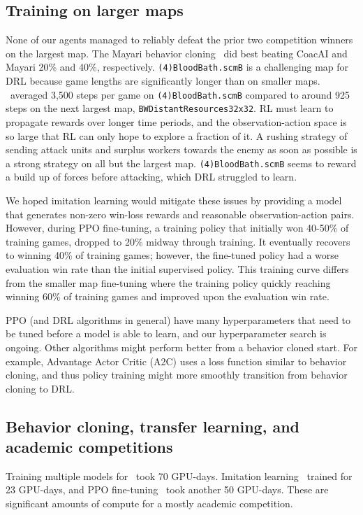 \documentclass{article}
\begin{document}
\subsection{Training on larger maps}
None of our agents managed to reliably defeat the prior two competition winners on 
the largest map. The Mayari behavior cloning \bcAgent\ did best beating
CoacAI and Mayari 20\% and 40\%, respectively. \texttt{(4)BloodBath.scmB} is a
challenging map for DRL because game lengths are significantly longer than on smaller
maps. \bcPPOAgent\ averaged 3,500 steps per game on
\texttt{(4)BloodBath.scmB} compared to around 925 steps on the next largest map,
\texttt{BWDistantResources32x32}. RL must learn to propagate rewards over longer time
periods, and the observation-action space is so large that RL can only hope to explore a
fraction of it. A rushing strategy of sending attack units and surplus workers towards
the enemy as soon as possible is a strong strategy on all but the largest map.
\texttt{(4)BloodBath.scmB} seems to reward a build up of forces before attacking, which
DRL struggled to learn.

We hoped imitation learning would mitigate these issues by providing a model that
generates non-zero win-loss rewards and reasonable observation-action pairs.
However, during PPO fine-tuning, a training policy that initially won 40-50\% of
training games, dropped to 20\% midway through training. It eventually recovers to
winning 40\% of training games; however, the fine-tuned policy had a worse evaluation
win rate than the initial supervised policy. This training curve differs from the
smaller map fine-tuning where the training policy quickly reaching winning 60\% of
training games and improved upon the evaluation win rate.

PPO (and DRL algorithms in general) have many hyperparameters that need to be tuned
before a model is able to learn, and our hyperparameter search is ongoing. Other 
algorithms might perform better from a behavior cloned start. For example,
Advantage Actor Critic (A2C) \citep{DBLP:journals/corr/MnihBMGLHSK16} uses a loss
function similar to behavior cloning, and thus policy training might more smoothly
transition from behavior cloning to DRL.

\subsection{Behavior cloning, transfer learning, and academic competitions}
Training multiple models for \agentName\ took 70 GPU-days. Imitation learning \bcAgent\
trained for 23 GPU-days, and PPO fine-tuning \bcPPOAgent\ took another 50 GPU-days. 
These are significant amounts of compute for a mostly academic competition.
\end{document}
